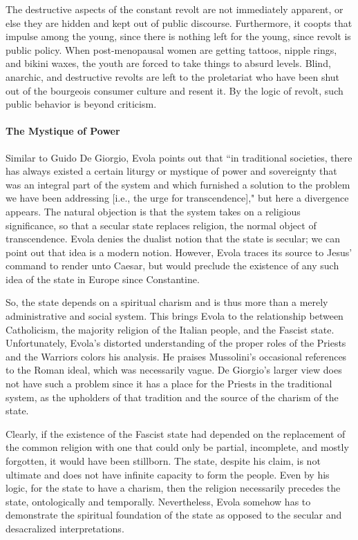 The destructive aspects of the constant revolt are not immediately apparent, or else they are hidden and kept out of public discourse. Furthermore, it coopts that impulse among the young, since there is nothing left for the young, since revolt is public policy. When post-menopausal women are getting tattoos, nipple rings, and bikini waxes, the youth are forced to take things to absurd levels. Blind, anarchic, and destructive revolts are left to the proletariat who have been shut out of the bourgeois consumer culture and resent it. By the logic of revolt, such public behavior is beyond criticism.

\paragraph{The Mystique of Power}
Similar to Guido De Giorgio, Evola points out that ``in traditional societies, there has always existed a certain liturgy or mystique of power and sovereignty that was an integral part of the system and which furnished a solution to the problem we have been addressing [i.e., the urge for transcendence]," but here a divergence appears. The natural objection is that the system takes on a religious significance, so that a secular state replaces religion, the normal object of transcendence. Evola denies the dualist notion that the state is secular; we can point out that idea is a modern notion. However, Evola traces its source to Jesus' command to render unto Caesar, but would preclude the existence of any such idea of the state in Europe since Constantine.

So, the state depends on a spiritual charism and is thus more than a merely administrative and social system. This brings Evola to the relationship between Catholicism, the majority religion of the Italian people, and the Fascist state. Unfortunately, Evola's distorted understanding of the proper roles of the Priests and the Warriors colors his analysis. He praises Mussolini's occasional references to the Roman ideal, which was necessarily vague. De Giorgio's larger view does not have such a problem since it has a place for the Priests in the traditional system, as the upholders of that tradition and the source of the charism of the state.

Clearly, if the existence of the Fascist state had depended on the replacement of the common religion with one that could only be partial, incomplete, and mostly forgotten, it would have been stillborn. The state, despite his claim, is not ultimate and does not have infinite capacity to form the people. Even by his logic, for the state to have a charism, then the religion necessarily precedes the state, ontologically and temporally. Nevertheless, Evola somehow has to demonstrate the spiritual foundation of the state as opposed to the secular and desacralized interpretations.

